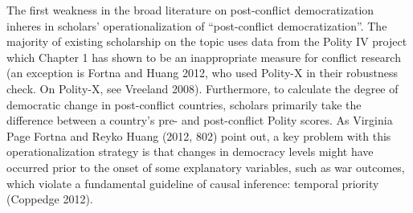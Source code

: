 \documentclass [11pt]{article}
\begin{document}


The first weakness in the broad literature on post-conflict democratization inheres in scholars' operationalization of ``post-conflict democratization''. The majority of existing scholarship on the topic uses data from the Polity IV project which Chapter 1 has shown to be an inappropriate measure for conflict research (an exception is Fortna and Huang 2012, who used Polity-X in their robustness check. On Polity-X, see Vreeland 2008). Furthermore, to calculate the degree of democratic change in post-conflict countries, scholars primarily take the difference between a country's pre- and post-conflict Polity scores. As Virginia Page Fortna and Reyko Huang (2012, 802) point out, a key problem with this operationalization strategy is that changes in democracy levels might have occurred prior to the onset of some explanatory variables, such as war outcomes, which violate a fundamental guideline of causal inference: temporal priority (Coppedge 2012).
\end{document}
